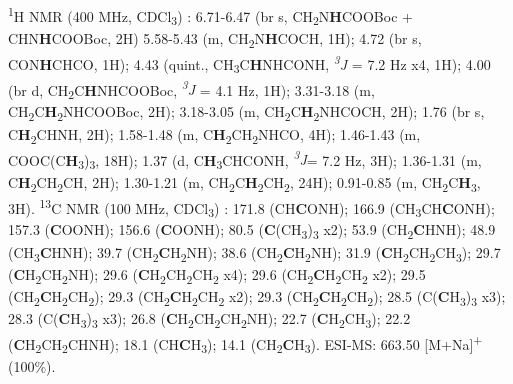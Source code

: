 \textsuperscript{1}H NMR (400 MHz, CDCl\textsubscript{3}) \textdelta:
6.71-6.47 (br s, CH\textsubscript{2}N\textbf{H}COOBoc + CHN\textbf{H}COOBoc, 2H) 5.58-5.43 (m, CH\textsubscript{2}N\textbf{H}COCH, 1H); 4.72 (br s, CON\textbf{H}CHCO, 1H); 4.43 (quint., CH\textsubscript{3}C\textbf{H}NHCONH,\textit{ \textsuperscript{3}J} = 7.2 Hz x4, 1H); 4.00 (br d, CH\textsubscript{2}C\textbf{H}NHCOOBoc, \textit{\textsuperscript{3}J} = 4.1 Hz, 1H); 3.31-3.18 (m, CH\textsubscript{2}C\textbf{H}\textsubscript{2}NHCOOBoc, 2H);
3.18-3.05 (m, CH\textsubscript{2}C\textbf{H}\textsubscript{2}NHCOCH, 2H); 1.76 (br s, C\textbf{H}\textsubscript{2}CHNH, 2H); 1.58-1.48 (m, C\textbf{H}\textsubscript{2}CH\textsubscript{2}NHCO, 4H); 1.46-1.43 (m, COOC(C\textbf{H}\textsubscript{3})\textsubscript{3}, 18H); 1.37 (d, C\textbf{H}\textsubscript{3}CHCONH, \textit{\textsuperscript{3}J}= 7.2 Hz, 3H); 1.36-1.31 (m, C\textbf{H}\textsubscript{2}CH\textsubscript{2}CH, 2H); 1.30-1.21 (m, CH\textsubscript{2}C\textbf{H}\textsubscript{2}CH\textsubscript{2}, 24H);  0.91-0.85 (m, CH\textsubscript{2}C\textbf{H}\textsubscript{3}, 3H).     
\newline
\textsuperscript{13}C NMR (100 MHz, CDCl\textsubscript{3}) \textdelta:
171.8 (CH\textbf{C}ONH); 166.9 (CH\textsubscript{3}CH\textbf{C}ONH); 157.3 (\textbf{C}OONH); 156.6 (\textbf{C}OONH); 80.5 (\textbf{C}(CH\textsubscript{3})\textsubscript{3} x2); 53.9 (CH\textsubscript{2}\textbf{C}HNH); 48.9 (CH\textsubscript{3}\textbf{C}HNH); 39.7 (CH\textsubscript{2}\textbf{C}H\textsubscript{2}NH); 38.6 (CH\textsubscript{2}\textbf{C}H\textsubscript{2}NH); 31.9 (\textbf{C}H\textsubscript{2}CH\textsubscript{2}CH\textsubscript{3}); 29.7 (\textbf{C}H\textsubscript{2}CH\textsubscript{2}NH); 29.6 (\textbf{C}H\textsubscript{2}CH\textsubscript{2}CH\textsubscript{2} x4); 29.6 (CH\textsubscript{2}\textbf{C}H\textsubscript{2}CH\textsubscript{2} x2); 29.5 (CH\textsubscript{2}\textbf{C}H\textsubscript{2}CH\textsubscript{2}); 29.3 (CH\textsubscript{2}\textbf{C}H\textsubscript{2}CH\textsubscript{2} x2); 29.3 (CH\textsubscript{2}\textbf{C}H\textsubscript{2}CH\textsubscript{2}); 28.5  (C(\textbf{C}H\textsubscript{3})\textsubscript{3} x3);  28.3 (C(\textbf{C}H\textsubscript{3})\textsubscript{3} x3); 26.8 (\textbf{C}H\textsubscript{2}CH\textsubscript{2}CH\textsubscript{2}NH); 22.7 (\textbf{C}H\textsubscript{2}CH\textsubscript{3}); 22.2 (\textbf{C}H\textsubscript{2}CH\textsubscript{2}CHNH); 18.1 (CH\textbf{C}H\textsubscript{3}); 14.1 (CH\textsubscript{2}\textbf{C}H\textsubscript{3}). 
\newline
ESI-MS: 663.50 [M+Na]\textsuperscript{+} (100\%).
